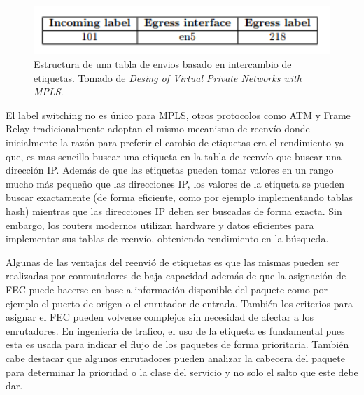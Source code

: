 \documentclass[10pt,journal,compsoc]{IEEEtran}
\begin{document}
\begin{figure}[h]
    \center
    \includegraphics[width=15cm]{tabla}
    \caption{Estructura de una tabla de envios basado en intercambio de etiquetas. Tomado de \emph{Desing of Virtual Private Networks with MPLS}\cite{rexford}.}
    \label{fig:tradicitional-architecture}
\end{figure}


El label switching no es único para MPLS, otros protocolos como ATM y Frame Relay tradicionalmente adoptan el mismo mecanismo de reenvío donde inicialmente la razón para preferir el cambio de etiquetas era el rendimiento ya que, es mas sencillo buscar una etiqueta en la tabla de reenvío que buscar una dirección IP.
Además de que las etiquetas pueden tomar valores en un rango mucho más pequeño que las direcciones IP, los valores de la etiqueta se pueden buscar exactamente (de forma eficiente, como por ejemplo implementando tablas hash) mientras que las direcciones IP deben ser buscadas de forma exacta. Sin embargo, los routers modernos utilizan
hardware y datos eficientes para implementar sus tablas de reenvío, obteniendo rendimiento en la búsqueda. 


Algunas de las ventajas del reenvió de etiquetas es que las mismas pueden ser realizadas por conmutadores de baja capacidad además de que la asignación de FEC  puede hacerse en base a información disponible del paquete como  por ejemplo el puerto de origen o el enrutador de entrada. También  los criterios para asignar el FEC pueden volverse complejos sin necesidad de afectar a los enrutadores. En ingeniería de trafico, el uso de la etiqueta es fundamental pues esta es usada para indicar el flujo de los paquetes de forma prioritaria. 
También cabe destacar que algunos enrutadores pueden analizar la cabecera del paquete para determinar la prioridad o la clase del servicio y no solo el salto que este debe dar. 


\end{document}
